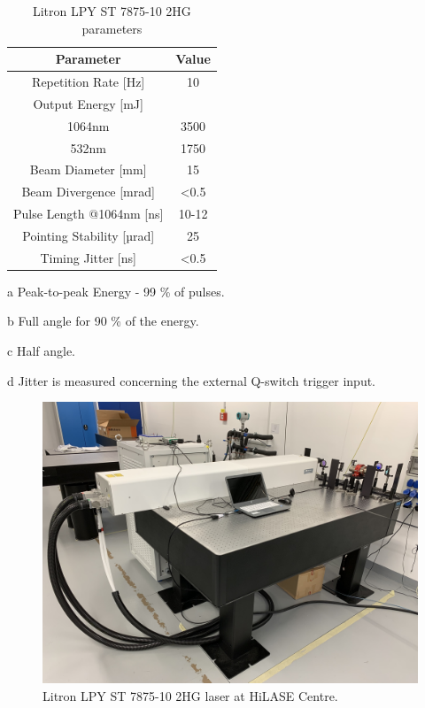 \begin{table}[h!]
\centering
    \begin{threeparttable}
        \begin{tabular}{||c | c||} 
        \hline
            \textbf{Parameter} & \textbf{Value} \\ [0.5ex] 
        \hline\hline
        Repetition Rate [Hz] & 10  \\ 
        \hline
            Output Energy [mJ] & \\
            1064nm & 3500 \\
            532nm & 1750 \\
        \hline
            Beam Diameter [mm] & 15 \tnote{a} \\
        \hline
            Beam Divergence [mrad] & <0.5 \tnote{b} \\ 
        \hline
            Pulse Length @1064nm [ns] & 10-12 \\
        \hline
            Pointing Stability [µrad] & 25 \tnote{c} \\
        \hline
            Timing Jitter [ns] & <0.5 \tnote{d}  \\
        \hline
        \hline
        \end{tabular}
        \begin{tablenotes}
            \small
            \item[a] Peak-to-peak Energy - 99 \% of pulses. 
            \item[b] Full angle for 90 \% of the energy.
            \item[c] Half angle.
            \item[d] Jitter is measured concerning the external Q-switch trigger input.
        \end{tablenotes}
    
        \caption{Litron LPY ST 7875-10 2HG parameters}
        \label{litronparameters}
    \end{threeparttable}
\end{table}

\begin{figure}[h]
    \centering
    \includegraphics[width=0.6\linewidth]{img/litron.JPG}
    \caption{Litron LPY ST 7875-10 2HG laser at HiLASE Centre.}
    \label{fig:litron}
\end{figure}



